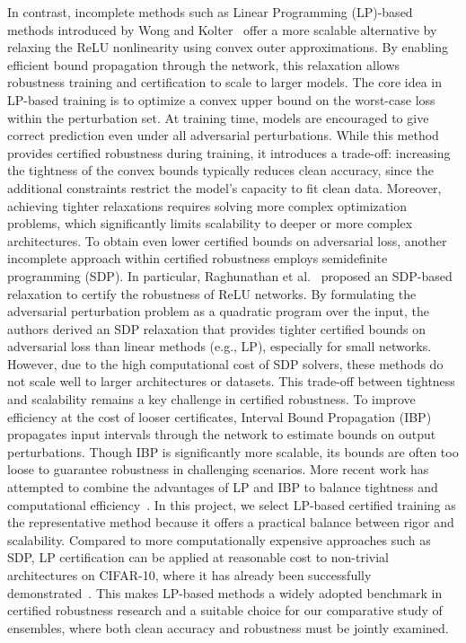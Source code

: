 In contrast, incomplete methods such as Linear Programming (LP)-based methods introduced by Wong and Kolter~\cite{wong2018provable} offer a more scalable alternative by relaxing the ReLU nonlinearity using convex outer approximations. By enabling efficient bound propagation through the network, this relaxation allows robustness training and certification to scale to larger models. The core idea in LP-based training is to optimize a convex upper bound on the worst-case loss within the perturbation set. At training time, models are encouraged to give correct prediction even under all adversarial perturbations. While this method provides certified robustness during training, it introduces a trade-off: increasing the tightness of the convex bounds typically reduces clean accuracy, since the additional constraints restrict the model’s capacity to fit clean data. Moreover, achieving tighter relaxations requires solving more complex optimization problems, which significantly limits scalability to deeper or more complex architectures. To obtain even lower certified bounds on adversarial loss, another incomplete approach within certified robustness employs semidefinite programming (SDP). In particular, Raghunathan et al.~\cite{raghunathan2018semidefinite} proposed an SDP-based relaxation to certify the robustness of ReLU networks. By formulating the adversarial perturbation problem as a quadratic program over the input, the authors derived an SDP relaxation that provides tighter certified bounds on adversarial loss than linear methods (e.g., LP), especially for small networks. However, due to the high computational cost of SDP solvers, these methods do not scale well to larger architectures or datasets. This trade-off between tightness and scalability remains a key challenge in certified robustness. To improve efficiency at the cost of looser certificates, Interval Bound Propagation (IBP)~\cite{gowal2018effectiveness} propagates input intervals through the network to estimate bounds on output perturbations. Though IBP is significantly more scalable, its bounds are often too loose to guarantee robustness in challenging scenarios. More recent work has attempted to combine the advantages of LP and IBP to balance tightness and computational efficiency~\cite{zhang2019towards}. In this project, we select LP-based certified training as the representative method because it offers a practical balance between rigor and scalability. Compared to more computationally expensive approaches such as SDP, LP certification can be applied at reasonable cost to non-trivial architectures on CIFAR-10, where it has already been successfully demonstrated~\cite{wong2018scaling}. This makes LP-based methods a widely adopted benchmark in certified robustness research and a suitable choice for our comparative study of ensembles, where both clean accuracy and robustness must be jointly examined.


